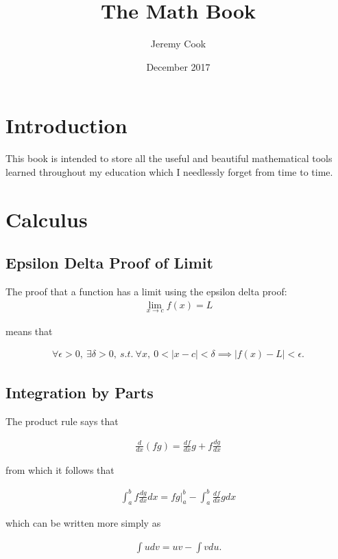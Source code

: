 \documentclass{article}
\title{The Math Book}
\author{Jeremy Cook}
\date{December 2017}
\numberwithin{theorem}{subsection}
\numberwithin{theorem}{subsubsection}
\theoremstyle{definition}
\numberwithin{definition}{subsection}
\numberwithin{definition}{subsubsection}
\begin{document}
\maketitle

\tableofcontents
\newpage

\section{Introduction}
This book is intended to store all the useful and beautiful mathematical tools learned throughout my education which I needlessly forget from time to time.

\section{Calculus}

\subsection{Epsilon Delta Proof of Limit} 
The proof that a function has a limit using the epsilon delta proof:
\begin{gather*}
    \lim_{x \rightarrow c} f(x) = L
\end{gather*}

\noindent means that

\begin{gather*}
    \forall \epsilon > 0,\ \exists \delta > 0,\ s.t.\ \forall x,\ 0 < |x - c| < \delta \implies |f(x) - L| < \epsilon.
\end{gather*}

\subsection{Integration by Parts}
The product rule says that 

\begin{gather*}
    \frac{d}{dx}(fg) = \frac{df}{dx}g + f\frac{dg}{dx}
\end{gather*}

\noindent from which it follows that 

\begin{gather*}
    \int_{a}^{b} f \frac{dg}{dx}dx = fg|_{a}^{b} - \int_{a}^{b} \frac{df}{dx}gdx
\end{gather*}

\noindent which can be written more simply as

\begin{gather*}
    \int udv = uv - \int vdu.
\end{gather*}
\end{document}
